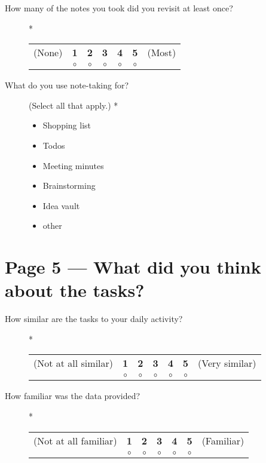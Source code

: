 \begin{description}
 \item[How many of the notes you took did you revisit at least once?] *

\begin{tabular}{ccccccc}
(None) & \textbf{1} & \textbf{2} & \textbf{3} & \textbf{4} & \textbf{5} & (Most) \\
& $\circ$ & $\circ$ & $\circ$ & $\circ$ & $\circ$ & \\
\end{tabular}
\end{description}

\begin{description}
 \item[What do you use note-taking for?] (Select all that apply.) *

\begin{itemize}[$\square$]
\item Shopping list
\item Todos
\item Meeting minutes
\item Brainstorming
\item Idea vault
\item other
\end{itemize}
\end{description}

\section*{Page 5 --- What did you think about the tasks?}

\begin{description}
 \item[How similar are the tasks to your daily activity?] *

\begin{tabular}{ccccccc}
(Not at all similar) & \textbf{1} & \textbf{2} & \textbf{3} & \textbf{4} & \textbf{5} & (Very similar) \\
& $\circ$ & $\circ$ & $\circ$ & $\circ$ & $\circ$ & \\
\end{tabular}
\end{description}

\begin{description}
 \item[How familiar was the data provided?] *

\begin{tabular}{ccccccc}
(Not at all familiar) & \textbf{1} & \textbf{2} & \textbf{3} & \textbf{4} & \textbf{5} & (Familiar) \\
& $\circ$ & $\circ$ & $\circ$ & $\circ$ & $\circ$ & \\
\end{tabular}
\end{description}

